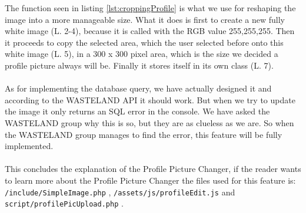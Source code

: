 The function seen in listing \ref{lst:croppingProfile} is what we use for reshaping the image into a more manageable size. What it does is first to create a new fully white image (L. 2-4), because it is called with the RGB value 255,255,255. Then it proceeds to copy the selected area, which the user selected before onto this white image (L. 5), in a 300 x 300 pixel area, which is the size we decided a profile picture always will be. Finally it stores itself in its own class (L. 7).\\
\\
As for implementing the database query, we have actually designed it and according to the WASTELAND API \citep{wastelandApi} it should work. But when we try to update the image it only returns an SQL error in the console. We have asked the WASTELAND group why this is so, but they are as clueless as we are. So when the WASTELAND group manages to find the error, this feature will be fully implemented.\\
\\
This concludes the explanation of the Profile Picture Changer, if the reader wants to learn more about the Profile Picture Changer the files used for this feature is: \texttt{/include/SimpleImage.php} , \texttt{/assets/js/profileEdit.js} and \texttt{script/profilePicUpload.php} .









